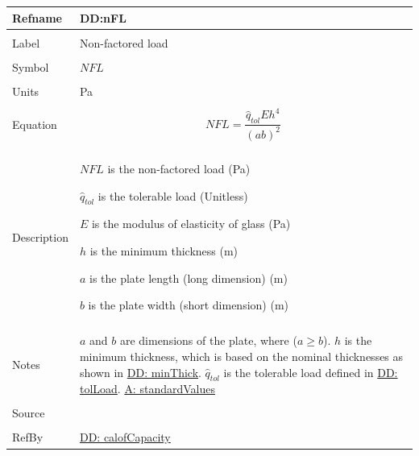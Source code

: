 \documentclass[12pt]{article}
\begin{document}
\noindent \begin{minipage}{\textwidth}
          \begin{tabular}{>{\raggedright}p{}>{\raggedright\arraybackslash}p{}}
          \toprule \textbf{Refname} & \textbf{DD:nFL}
          \label{DD:nFL}
          \\ \midrule \\
          Label & Non-factored load
          \\ \midrule \\
          Symbol & $NFL$
          \\ \midrule \\
          Units & Pa
          \\ \midrule \\
          Equation & \begin{displaymath}
                     NFL=\frac{{\hat{q}_{tol}} E h^{4}}{\left(a b\right)^{2}}
                     \end{displaymath}
          \\ \midrule \\
          Description & \begin{symbDescription}
                        \item{$NFL$ is the non-factored load (Pa)}
                        \item{${\hat{q}_{tol}}$ is the tolerable load (Unitless)}
                        \item{$E$ is the modulus of elasticity of glass (Pa)}
                        \item{$h$ is the minimum thickness (m)}
                        \item{$a$ is the plate length (long dimension) (m)}
                        \item{$b$ is the plate width (short dimension) (m)}
                        \end{symbDescription}
          \\ \midrule \\
          Notes & $a$ and $b$ are dimensions of the plate, where ($a\geq{}b$).
                  $h$ is the minimum thickness, which is based on the nominal thicknesses as shown in \hyperref[DD:minThick]{DD: minThick}.
                  ${\hat{q}_{tol}}$ is the tolerable load defined in \hyperref[DD:tolLoad]{DD: tolLoad}.
                  \hyperref[assumpSV]{A: standardValues}
          \\ \midrule \\
          Source & \cite{astm2009}
          \\ \midrule \\
          RefBy & \hyperref[DD:calofCapacity]{DD: calofCapacity}
          \\ \bottomrule
          \end{tabular}
          \end{minipage}
\par~
\end{document}
